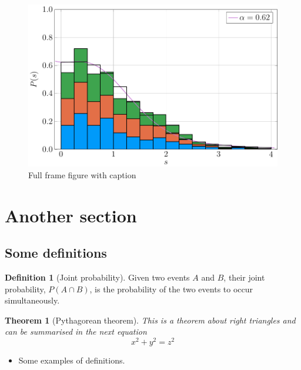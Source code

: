 \documentclass[a4,compress]{beamer}
\theoremstyle{plain}
\newtheorem*{theorem*}{Theorem}
\theoremstyle{definition}
\newtheorem*{def*}{Definition}
\begin{document}
\begin{frame}
  \begin{figure}[h]
    \centering
    \includegraphics[width=\textwidth]{quantum/P(s)_slice_1}
    \caption{Full frame figure with caption}
  \end{figure}
\end{frame}


\section[Another section]{Another section}

\subsection{Some definitions}

\begin{frame}
  \begin{def*}[Joint probability]
    	Given two events $A$ and $B$, their joint probability, \(P(A \cap B)\), is
    	the probability of the two events to occur simultaneously.
  \end{def*}
  \begin{theorem*}[Pythagorean theorem]
    	This is a theorem about right triangles and can be summarised in the next equation 
	\[
	x^2 + y^2 = z^2
	\]
  \end{theorem*}
  \begin{itemize}
    \item Some examples of definitions.
  \end{itemize}
\end{frame}
\end{document}
